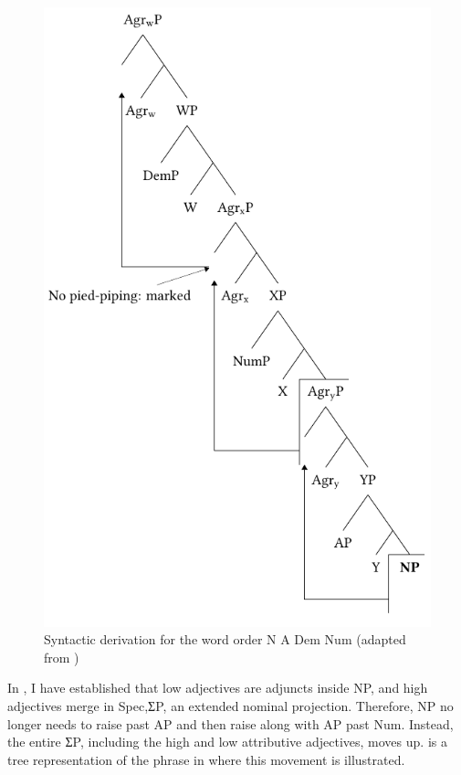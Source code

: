 \documentclass[output=paper]{langscibook}
\begin{document}
  
\begin{figure}
\includegraphics{figures/baron-img2.pdf}
\caption{Syntactic derivation for the word order N A Dem Num (adapted from \citealt{Cinque2005})} 
\label{fig:baron:2}
\end{figure}

In , I have established that low adjectives are adjuncts inside NP, and high adjectives merge in Spec,ƩP, an extended nominal projection. Therefore, NP no longer needs to raise past AP and then raise along with AP past Num. Instead, the entire ƩP, including the high and low attributive adjectives, moves up.  is a tree representation of the phrase in  where this movement is illustrated.
\end{document}
